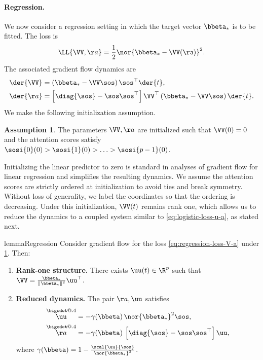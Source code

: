 \documentclass{article}
\makeatletter
\newcommand*\bigcdot{\mathpalette\bigcdot@{.4}}
\newcommand*\bigcdot@[2]{\mathbin{\vcenter{\hbox{\scalebox{#2}{$\m@th#1\bullet$}}}}}
\newcommand{\mdot}[1]{\overset{\bigcdot}{#1}}
\theoremstyle{plain}
\theoremstyle{definition}
\newtheorem{assumption}[theorem]{Assumption}
\theoremstyle{remark}
\makeatother
\begin{document}
\paragraph{Regression.}
We now consider a regression setting in which the target vector $\bbeta_*$ is to be fitted. The loss is 
\begin{align} \label{eq:regression-loss-V-a}
  \LL{\VV, \aa} = \frac{1}{2} \nor{ \bbeta_* - \VV \sf(\aa) }^2.
\end{align}
The associated gradient flow dynamics are
\begin{align*}
  \der{\VV} &=  \left(\bbeta_* - \VV \sos \right) \sos^{\top} \der{t}, \\
  \der{\aa} &=  \left[ \diag{\sos} - \sos \sos^{\top} \right] \VV^{\top} \left(  \bbeta_* - \VV \sos \right) \der{t}.
\end{align*}
We make the following initialization assumption.
\begin{assumption} \label{assm:regression-init}
  The parameters $\VV, \aa$ are initialized such that $\VV(0) = 0$ and the attention scores satisfy $ \sosi{0}(0) > \sosi{1}(0) > \ldots > \sosi{p-1}(0) $.
\end{assumption}
%
Initializing the linear predictor to zero is standard in analyses of gradient flow for linear regression and simplifies the resulting dynamics. We assume the attention scores are strictly ordered at initialization to avoid ties and break symmetry. Without loss of generality, we label the coordinates so that the ordering is decreasing. Under this initialization, $\VV(t)$ remains rank one, which allows us to reduce the dynamics to a coupled system similar to \cref{eq:logistic-loss-u-a}, as stated next.
\begin{restatable}{lemma}{Regression}
Consider gradient flow for the loss \eqref{eq:regression-loss-V-a} under \cref{assm:regression-init}. Then:
\begin{enumerate}[label=(\alph*)]
    \item \textbf{Rank-one structure.} 
 There exists $\uu(t)\in\R^p$ such that $\VV = \frac{\bbeta_*}{\|\bbeta_*\|^2} \uu^{\top} $.
    \item \textbf{Reduced dynamics.} The pair $\aa, \uu $ satisfies  
\begin{align} \label{eq:regression-loss-u-a}
  \mdot{\uu} &= - \gamma(\bbeta) \, \nor{\bbeta_*}^2 \sos, \\
  \mdot{\aa} &= - \gamma(\bbeta) \, \left[ \diag{\sos} - \sos \sos^{\top} \right] \uu, 
\end{align}
where $ \gamma(\bbeta) =  1 - \frac{\scal{\uu}{\sos}}{\nor{\bbeta_*}^2}$.
\end{enumerate}
\end{restatable}
\end{document}
